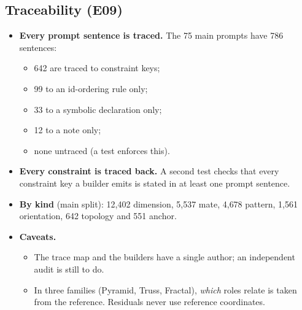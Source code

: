 \documentclass[10pt,a4paper]{article}
\begin{document}
\subsection{Traceability (E09)}
\begin{itemize}
\item \textbf{Every prompt sentence is traced.} The 75 main prompts have 786 sentences:
  \begin{itemize}
  \item 642 are traced to constraint keys;
  \item 99 to an id-ordering rule only;
  \item 33 to a symbolic declaration only;
  \item 12 to a note only;
  \item none untraced (a test enforces this).
  \end{itemize}
\item \textbf{Every constraint is traced back.} A second test checks that every constraint key a builder emits is stated in at least one prompt sentence.
\item \textbf{By kind} (main split): 12{,}402 dimension, 5{,}537 mate, 4{,}678 pattern, 1{,}561 orientation, 642 topology and 551 anchor.
\item \textbf{Caveats.}
  \begin{itemize}
  \item The trace map and the builders have a single author; an independent audit is still to do.
  \item In three families (Pyramid, Truss, Fractal), \emph{which} roles relate is taken from the reference. Residuals never use reference coordinates.
  \end{itemize}
\end{itemize}

\end{document}
